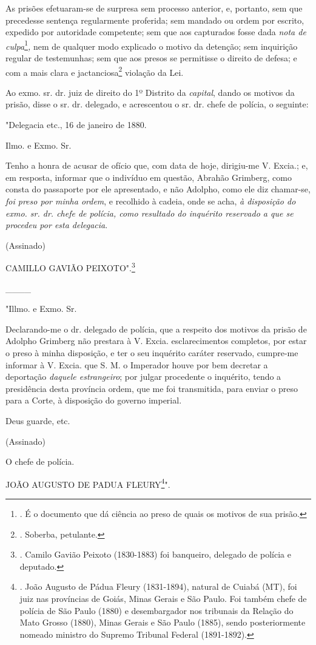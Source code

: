 As prisões efetuaram-se de surpresa sem processo anterior, e, portanto,
sem que precedesse sentença regularmente proferida; sem mandado ou ordem
por escrito, expedido por autoridade competente; sem que aos capturados
fosse dada \emph{nota de culpa}\footnote{. É o documento que dá ciência
  ao preso de quais os motivos de sua prisão.}\emph{,} nem de qualquer
modo explicado o motivo da detenção; sem inquirição regular de
testemunhas; sem que aos presos se permitisse o direito de defesa; e com
a mais clara e jactanciosa\footnote{. Soberba, petulante.} violação da
Lei.

Ao exmo. sr. dr. juiz de direito do 1º Distrito da \emph{capital}, dando
os motivos da prisão, disse o sr. dr. delegado, e acrescentou o sr. dr.
chefe de polícia, o seguinte:

"Delegacia etc., 16 de janeiro de 1880.

Ilmo. e Exmo. Sr.

Tenho a honra de acusar de ofício que, com data de hoje, dirigiu-me V.
Excia.; e, em resposta, informar que o indivíduo em questão, Abrahão
Grimberg, como consta do passaporte por ele apresentado, e não Adolpho,
como ele diz chamar-se, \emph{foi preso por minha ordem}, e recolhido à
cadeia, onde se acha, \emph{à disposição do exmo. sr. dr. chefe de
polícia, como resultado do inquérito reservado a que se procedeu por
esta delegacia}.

(Assinado)

CAMILLO GAVIÃO PEIXOTO".\footnote{. Camilo Gavião Peixoto (1830-1883)
  foi banqueiro, delegado de polícia e deputado.}

\_\_\_\_

"Illmo. e Exmo. Sr.

Declarando-me o dr. delegado de polícia, que a respeito dos motivos da
prisão de Adolpho Grimberg não prestara à V. Excia. esclarecimentos
completos, por estar o preso à minha disposição, e ter o seu inquérito
caráter reservado, cumpre-me informar à V. Excia. que S. M. o Imperador
houve por bem decretar a deportação \emph{daquele estrangeiro}; por
julgar procedente o inquérito, tendo a presidência desta província
ordem, que me foi transmitida, para enviar o preso para a Corte, à
disposição do governo imperial.

Deus guarde, etc.

(Assinado)

O chefe de polícia.

JOÃO AUGUSTO DE PADUA FLEURY\footnote{. João Augusto de Pádua Fleury
  (1831-1894), natural de Cuiabá (MT), foi juiz nas províncias de Goiás,
  Minas Gerais e São Paulo. Foi também chefe de polícia de São Paulo
  (1880) e desembargador nos tribunais da Relação do Mato Grosso (1880),
  Minas Gerais e São Paulo (1885), sendo posteriormente nomeado ministro
  do Supremo Tribunal Federal (1891-1892).}".

